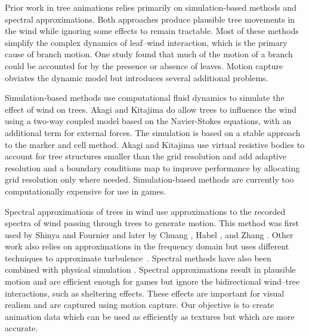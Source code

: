 Prior work in tree animations relies primarily on simulation-based methods and spectral approximations. Both approaches produce plausible tree movements in the wind while ignoring some effects to remain tractable. Most of these methods simplify the complex dynamics of leaf--wind interaction, which is the primary cause of branch motion. One study \cite{Rudnicki:PBC06} found that much of the motion of a branch could be accounted for by the presence or absence of leaves.  Motion capture obviates the dynamic model but introduces several additional problems. 

Simulation-based methods use computational fluid dynamics to simulate the effect of wind on trees. Akagi and Kitajima \cite{Akagi:cg06} do allow trees to influence the wind using a two-way coupled model based on the Navier-Stokes equations, with an additional term for external forces. The simulation is based on a stable approach \cite{stams:eu97} to the marker and cell method. Akagi and Kitajima use virtual resistive bodies to account for tree structures smaller than the grid resolution and add adaptive resolution and a boundary conditions map to improve performance by allocating grid resolution only where needed.  Simulation-based methods are currently too computationally expensive for use in games.  

Spectral approximations of trees in wind use approximations to the recorded spectra of wind passing through trees to generate motion.  This method was first used by Shinya and Fournier \cite{shinya:eu92} and later by Chuang \cite{Chuang:sig05}, Habel \cite{Habel09PGT}, and Zhang \cite{ZhangSTCP06}. Other work also relies on approximations in the frequency domain but uses different techniques to approximate turbulence~\cite{ono:eu97,ota:cgi03,stams:eu97}. Spectral methods have also been combined with physical simulation \cite{Ota:TFMC04,ZhangSTCP06}. Spectral approximations result in plausible motion and are efficient enough for games but ignore the bidirectional wind--tree interactions, such as sheltering effects.  These effects are important for visual realism and are captured using motion capture.  Our objective is to create animation data which can be used as efficiently as textures but which are more accurate.  

